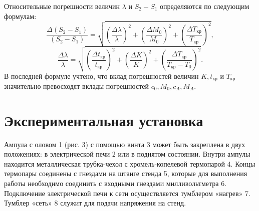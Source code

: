 \documentclass[a4paper]{article}
\begin{document}
Относительные погрешности величин $\lambda$ и $S_2-S_1$ определяются по следующим формулам:
\begin{equation} \label{eq:16}
\frac{\Delta(S_2 - S_1)}{(S_2 - S_1)} = \sqrt{ \left(\frac{\Delta\lambda}{\lambda}\right)^2 + \left(\frac{\Delta M_0}{M_0}\right)^2 + \left(\frac{\Delta T_{\text{кр}}}{T_{\text{кр}}}\right)^2 },
\end{equation}
\begin{equation} \label{eq:17}
\frac{\Delta\lambda}{\lambda} = \sqrt{ \left(\frac{\Delta t_{\text{кр}}}{t_{\text{кр}}}\right)^2 + \left(\frac{\Delta K}{K}\right)^2 + \left(\frac{\Delta T_{\text{кр}}}{T_{\text{кр}} - T_0}\right)^2 }.
\end{equation}
В последней формуле учтено, что вклад погрешностей величин $K, t_{\text{кр}}$ и $T_{\text{кр}}$ значительно превосходят вклады погрешностей $c_0, M_0, c_A, M_A$.

\section*{Экспериментальная установка}

Ампула с оловом 1 (рис. 3) с помощью винта 3 может быть закреплена в двух положениях: в электрической печи 2 или в поднятом состоянии. Внутри ампулы находится металлическая трубка-чехол с хромель-копелевой термопарой 4. Концы термопары соединены с гнездами на штанге стенда 5, которые для выполнения работы необходимо соединить с входными гнездами милливольтметра 6. Подключение электрической печи к сети осуществляется тумблером «нагрев» 7. Тумблер «сеть» 8 служит для подачи напряжения на стенд.
\end{document}
